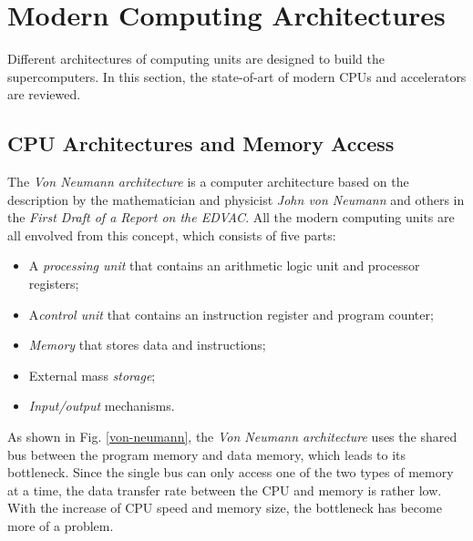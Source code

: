 \section{Modern Computing Architectures}

Different architectures of computing units are designed to build the supercomputers. In this section, the state-of-art of modern CPUs and accelerators are reviewed.

\subsection{CPU Architectures and Memory Access}

The \textit{Von Neumann architecture} is a computer architecture based on the description by the mathematician and physicist \textit{John von Neumann} and others in the \textit{First Draft of a Report on the EDVAC}. All the modern computing units are all envolved from this concept, which consists of five parts:

\begin{itemize}
	\item A \textit{processing unit} that contains an arithmetic logic unit and processor registers;
	\item A\textit{control unit} that contains an instruction register and program counter;
	\item \textit{Memory} that stores data and instructions;
	\item External mass \textit{storage};
	\item \textit{Input/output} mechanisms.
\end{itemize}

As shown in Fig. \ref{von-neumann}, the \textit{Von Neumann architecture} uses the shared bus between the program memory and data memory, which leads to its bottleneck. Since the single bus can only access one of the two types of memory at a time, the data transfer rate between the CPU and memory is rather low. With the increase of CPU speed and memory size,  the bottleneck has become more of a problem.

